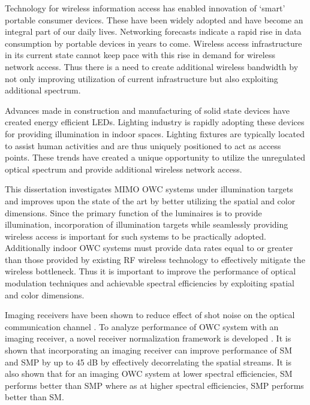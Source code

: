 Technology for wireless information access has enabled innovation of `smart' portable consumer devices. These have been widely adopted and have become an integral part of our daily lives. Networking forecasts indicate a rapid rise in data consumption by portable devices in years to come. Wireless access infrastructure in its current state cannot keep pace with this rise in demand for wireless network access. Thus there is a need to create additional wireless bandwidth by not only improving utilization of current infrastructure but also exploiting additional spectrum.

Advances made in construction and manufacturing of solid state devices have created energy efficient LEDs. Lighting industry is rapidly adopting these devices for providing illumination in indoor spaces. Lighting fixtures are typically located to assist human activities and are thus uniquely positioned to act as access points. These trends have created a unique opportunity to utilize the unregulated optical spectrum and provide additional wireless network access. 

This dissertation investigates MIMO OWC systems under illumination targets and improves upon the state of the art by better utilizing the spatial and color dimensions. Since the primary function of the luminaires is to provide illumination, incorporation of illumination targets while seamlessly providing wireless access is important for such systems to be practically adopted. Additionally indoor OWC systems must provide data rates equal to or greater than those provided by existing RF wireless technology to effectively mitigate the wireless bottleneck. Thus it is important to improve the performance of optical modulation techniques and achievable spectral efficiencies by exploiting spatial and color dimensions.

Imaging receivers have been shown to reduce effect of shot noise on the optical communication channel \cite{dja00a}. To analyze performance of OWC system with an imaging receiver, a novel receiver normalization framework is developed \cite{but14a}. It is shown that incorporating an imaging receiver can improve performance of SM and SMP by up to 45 dB by effectively decorrelating the spatial streams. It is also shown that for an imaging OWC system at lower spectral efficiencies, SM performs better than SMP where as at higher spectral efficiencies, SMP performs better than SM.


